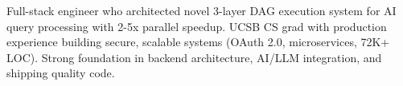 \documentclass[12pt, letterpaper]{russell}
\begin{document}
\makecvheader

\vspace{-.6cm}

\vspace{-0.05cm}
\begin{cvsummary}
Full-stack engineer who architected novel 3-layer DAG execution system for AI query processing with 2-5x parallel speedup. UCSB CS grad with production experience building secure, scalable systems (OAuth 2.0, microservices, 72K+ LOC). Strong foundation in backend architecture, AI/LLM integration, and shipping quality code.
\end{cvsummary}

\vspace{-0.05cm}
\end{document}
